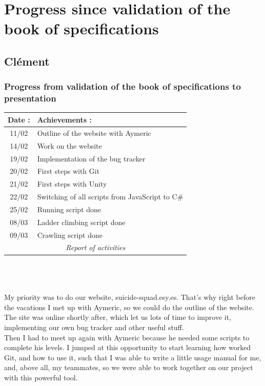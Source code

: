 \chapter{Progress since validation of the book of specifications}

	\section{Cl\'ement}
		\subsection{Progress from validation of the book of specifications to  presentation}
			\begin{tabular}{|c|l|}
				\hline \cellcolor{gray}Date :	& \cellcolor{gray}Achievements :\\
				\hline 11/02& Outline of the website with Aymeric\\
				\hline 14/02& Work on the website\\
				\hline 19/02& Implementation of the bug tracker\\
				\hline 20/02& First steps with Git\\
				\hline 21/02& First steps with Unity\\
				\hline 22/02& Switching of all scripts from JavaScript to C\#\\
				\hline 25/02& Running script done\\
				\hline 08/03& Ladder climbing script done\\
				\hline 09/03& Crawling script done\\
				\hline \multicolumn{2}{c}{\textit{Report of activities}}
			\end{tabular}
			\\\\\\
			My priority was to do our website, suicide-squad.esy.es. That's why right before the vacations I met up with Aymeric,
			so we could do the outline of the website. The site was online shortly after, which let us lots of time to improve it,
			implementing our own bug tracker and other useful stuff.
			\\
			Then I had to meet up again with Aymeric because he needed some scripts to complete his levels.
			I jumped at this opportunity to start learning how worked Git, and how to use it, such that I was able to write a little usage manual for me,
			and, above all, my teammates, so we were able to work together on our project with this powerful tool.


